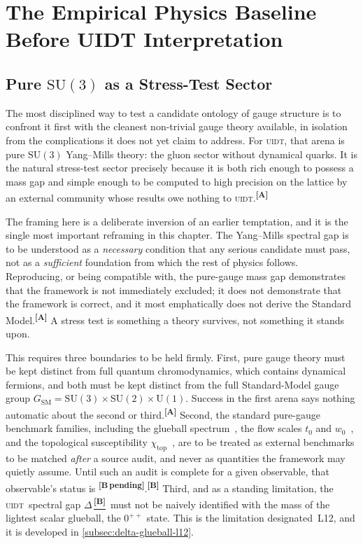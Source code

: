 \documentclass[12pt,a4paper,twoside]{article}
\theoremstyle{plain}
\theoremstyle{definition}
\theoremstyle{remark}
\newcommand{\UIDT}{\textsc{uidt}}
\newcommand{\catmark}[1]{\textsuperscript{\textsf{\textbf{[#1]}}}}
\newcommand{\Bdelta}{\hyperref[box:pi-override-delta]{\catmark{B}}}
\newcommand{\Bpending}{\catmark{B\,pending}}
\begin{document}
\section{The Empirical Physics Baseline Before UIDT Interpretation}
\label{sec:empirical-baseline}

\subsection{Pure \texorpdfstring{$\mathrm{SU}(3)$}{SU(3)} as a Stress-Test Sector}
\label{subsec:su3-stress-test}

The most disciplined way to test a candidate ontology of gauge structure is to confront it first with the cleanest non-trivial gauge theory available, in isolation from the complications it does not yet claim to address. For \UIDT, that arena is pure $\mathrm{SU}(3)$ Yang--Mills theory: the gluon sector without dynamical quarks. It is the natural stress-test sector precisely because it is both rich enough to possess a mass gap and simple enough to be computed to high precision on the lattice by an external community whose results owe nothing to \UIDT.\catmark{A}

The framing here is a deliberate inversion of an earlier temptation, and it is the single most important reframing in this chapter. The Yang--Mills spectral gap is to be understood as a \emph{necessary} condition that any serious candidate must pass, not as a \emph{sufficient} foundation from which the rest of physics follows. Reproducing, or being compatible with, the pure-gauge mass gap demonstrates that the framework is not immediately excluded; it does not demonstrate that the framework is correct, and it most emphatically does not derive the Standard Model.\catmark{A} A stress test is something a theory survives, not something it stands upon.

This requires three boundaries to be held firmly. First, pure gauge theory must be kept distinct from full quantum chromodynamics, which contains dynamical fermions, and both must be kept distinct from the full Standard-Model gauge group $G_{\mathrm{SM}} = \mathrm{SU}(3)\times\mathrm{SU}(2)\times\mathrm{U}(1)$. Success in the first arena says nothing automatic about the second or third.\catmark{A} Second, the standard pure-gauge benchmark families, including the glueball spectrum~\cite{morningstar1999,michael1989,athenodorou2020,athenodorou2021}, the flow scales $t_0$ and $w_0$~\cite{luscher2010}, and the topological susceptibility $\chi_{\mathrm{top}}$~\cite{durr2007}, are to be treated as external benchmarks to be matched \emph{after} a source audit, and never as quantities the framework may quietly assume. Until such an audit is complete for a given observable, that observable's status is \Bpending.\catmark{B} Third, and as a standing limitation, the \UIDT\ spectral gap $\Delta$\,\Bdelta\ must not be naively identified with the mass of the lightest scalar glueball, the $0^{++}$ state. This is the limitation designated~L12, and it is developed in \cref{subsec:delta-glueball-l12}.
\end{document}
